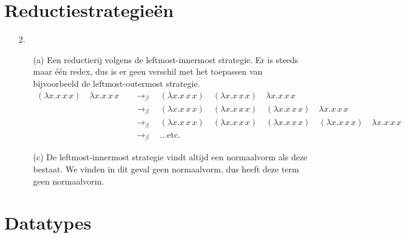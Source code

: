 \documentclass[a4paper,11pt]{article}
\begin{document}
\section{Reductiestrategie\"en}


\begin{enumerate}


\item[2.]

\begin{enumerate}
\item[(a)]
Een reductierij volgens de leftmost-innermost strategie. Er is steeds maar \'e\'en redex,
dus is er geen verschil met het toepassen van bijvoorbeeld de leftmost-outermost strategie.
\begin{align*}
  (\lambda x. x \, x \, x) \quad \lambda x. x \, x \, x
  & \quad \rightarrow_{\beta} \quad
  (\lambda x. x \, x \, x) \quad (\lambda x. x \, x \, x) \quad \lambda x. x \, x \, x\\
  & \quad \rightarrow_{\beta} \quad
  (\lambda x. x \, x \, x) \quad (\lambda x. x \, x \, x) \quad (\lambda x. x \, x \, x) \quad \lambda x. x \, x \, x\\
  & \quad \rightarrow_{\beta} \quad
  (\lambda x. x \, x \, x) \quad (\lambda x. x \, x \, x) \quad (\lambda x. x \, x \, x) \quad (\lambda x. x \, x \, x) \quad \lambda x. x \, x \, x\\
  & \quad \rightarrow_{\beta} \quad
  \ldots \text{etc.}
\end{align*}

\item[(c)]
De leftmost-innermost strategie vindt altijd een normaalvorm als deze bestaat.
We vinden in dit geval geen normaalvorm, dus heeft deze term geen normaalvorm. 

\end{enumerate}


\end{enumerate}


\section{Datatypes}
\end{document}
